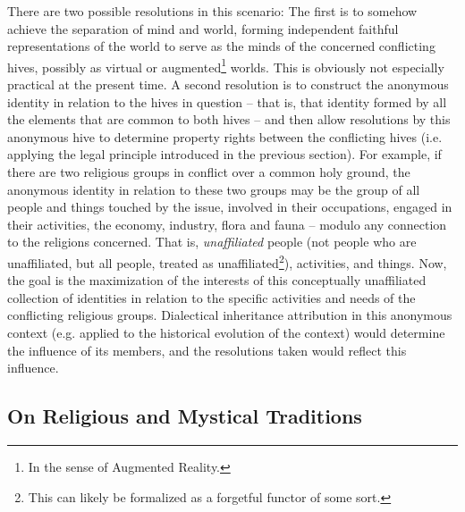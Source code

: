 \documentclass[pra,twocolumn,groupedaddress,10pt]{revtex4}
\theoremstyle{definition}
\begin{document}
There are two possible resolutions in this scenario: The first is to somehow achieve the separation of mind and world, forming independent faithful representations of the world to serve as the minds of the concerned conflicting hives, possibly as virtual or augmented\footnote{In the sense of Augmented Reality.} worlds. This is obviously not especially practical at the present time. A second resolution is to construct the anonymous identity in relation to the hives in question -- that is, that identity formed by all the elements that are common to both hives -- and then allow resolutions by this anonymous hive to determine property rights between the conflicting hives (i.e. applying the legal principle introduced in the previous section). For example, if there are two religious groups in conflict over a common holy ground, the anonymous identity in relation to these two groups may be the group of all people and things touched by the issue, involved in their occupations, engaged in their activities, the economy, industry, flora and fauna -- modulo any connection to the religions concerned. That is, \textit{unaffiliated} people (not people who are unaffiliated, but all people, treated as unaffiliated\footnote{This can likely be formalized as a forgetful functor of some sort.}), activities, and things. Now, the goal is the maximization of the interests of this conceptually unaffiliated collection of identities in relation to the specific activities and needs of the conflicting religious groups. Dialectical inheritance attribution in this anonymous context (e.g. applied to the historical evolution of the context) would determine the influence of its members, and the resolutions taken would reflect this influence.


\subsection{On Religious and Mystical Traditions} \label{sec:phirelhistra}
\end{document}
